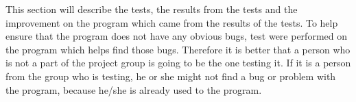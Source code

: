 This section will describe the tests, the results from the tests and the improvement on the program which came from the results of the tests. To help ensure that the program does not have any obvious bugs, test were performed on the program which helps find those bugs. Therefore it is better that a person who is not a part of the project group is going to be the one testing it. If it is a person from the group who is testing, he or she might not find a bug or problem with the program, because he/she is already used to the program. 